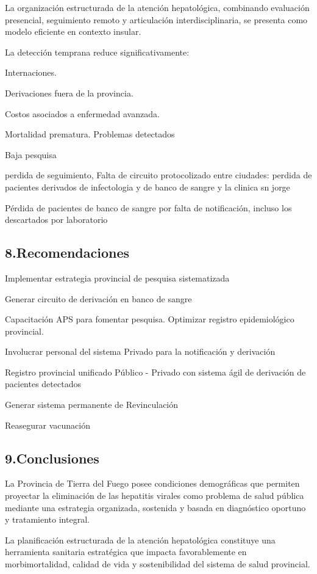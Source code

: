 \documentclass[
  letterpaper,
  DIV=11,
  numbers=noendperiod]{scrartcl}
\begin{document}
La organización estructurada de la atención hepatológica, combinando
evaluación presencial, seguimiento remoto y articulación
interdisciplinaria, se presenta como modelo eficiente en contexto
insular.

La detección temprana reduce significativamente:

Internaciones.

Derivaciones fuera de la provincia.

Costos asociados a enfermedad avanzada.

Mortalidad prematura. Problemas detectados

Baja pesquisa

perdida de seguimiento, Falta de circuito protocolizado entre ciudades:
perdida de pacientes derivados de infectologia y de banco de sangre y la
clinica sn jorge

Pérdida de pacientes de banco de sangre por falta de notificación,
incluso los descartados por laboratorio

\hypertarget{recomendaciones}{%
\subsection{\texorpdfstring{\textbf{8.Recomendaciones}}{8.Recomendaciones}}\label{recomendaciones}}

Implementar estrategia provincial de pesquisa sistematizada

Generar circuito de derivación en banco de sangre

Capacitación APS para fomentar pesquisa. Optimizar registro
epidemiológico provincial.

Involucrar personal del sistema Privado para la notificación y
derivación

Registro provincial unificado Público - Privado con sistema ágil de
derivación de pacientes detectados

Generar sistema permanente de Revinculación

Reasegurar vacunación

\hypertarget{conclusiones}{%
\subsection{\texorpdfstring{\textbf{9.Conclusiones}}{9.Conclusiones}}\label{conclusiones}}

La Provincia de Tierra del Fuego posee condiciones demográficas que
permiten proyectar la eliminación de las hepatitis virales como problema
de salud pública mediante una estrategia organizada, sostenida y basada
en diagnóstico oportuno y tratamiento integral.

La planificación estructurada de la atención hepatológica constituye una
herramienta sanitaria estratégica que impacta favorablemente en
morbimortalidad, calidad de vida y sostenibilidad del sistema de salud
provincial.
\end{document}
